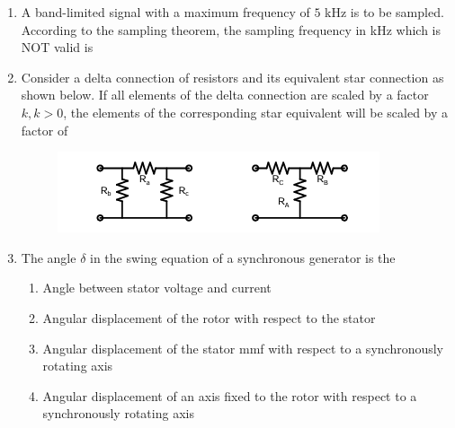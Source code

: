 \documentclass[journal,12pt,onecolumn]{IEEEtran}
\theoremstyle{remark}
\begin{document}
\begin{enumerate}
\begin{enumerate}
\end{enumerate}


\item A band-limited signal with a maximum frequency of $5$ kHz is to be sampled. According to the sampling theorem, the sampling frequency in kHz which is NOT valid is  

\begin{enumerate}
\end{enumerate}


\item Consider a delta connection of resistors and its equivalent star connection as shown below.  
If all elements of the delta connection are scaled by a factor $k, k>0$, the elements of the corresponding star equivalent will be scaled by a factor of  
\begin{figure}[h]
    \centering
    \includegraphics[width=0.5\columnwidth]{figs/7.png}
    \label{fig:placeholder}
\end{figure}
\begin{enumerate}
\end{enumerate}
\item The angle $\delta$ in the swing equation of a synchronous generator is the  
\begin{enumerate}
\item Angle between stator voltage and current  
\item Angular displacement of the rotor with respect to the stator  
\item Angular displacement of the stator mmf with respect to a synchronously rotating axis  
\item Angular displacement of an axis fixed to the rotor with respect to a synchronously rotating axis  
\end{enumerate}


\end{enumerate}
\end{document}
